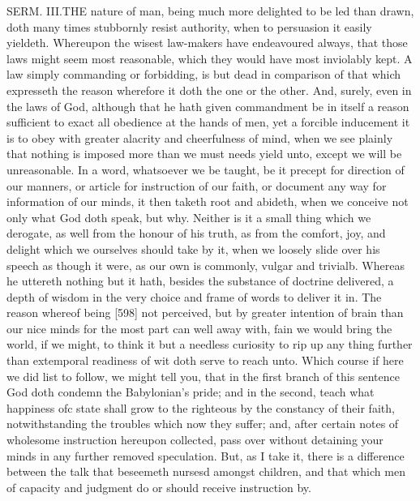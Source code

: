SERM. III.THE nature of man, being much more delighted to be led than drawn, doth many times stubbornly resist authority, when to persuasion it easily yieldeth. Whereupon the wisest law-makers have endeavoured always, that those laws might seem most reasonable, which they would have most inviolably kept. A law simply commanding or forbidding, is but dead in comparison of that which expresseth the reason wherefore it doth the one or the other. And, surely, even in the laws of God, although that he hath given commandment be in itself a reason sufficient to exact all obedience at the hands of men, yet a forcible inducement it is to obey with greater alacrity and cheerfulness of mind, when we see plainly that nothing is imposed more than we must needs yield unto, except we will be unreasonable. In a word, whatsoever we be taught, be it precept for direction of our manners, or article for instruction of our faith, or document any way for information of our minds, it then taketh root and abideth, when we conceive not only what God doth speak, but why. Neither is it a small thing which we derogate, as well from the honour of his truth, as from the comfort, joy, and delight which we ourselves should take by it, when we loosely slide over his speech as though it were, as our own is commonly, vulgar and trivialb. Whereas he uttereth nothing but it hath, besides the substance of doctrine delivered, a depth of wisdom in the very choice and frame of words to deliver it in. The reason whereof being [598] not perceived, but by greater intention of brain than our nice minds for the most part can well away with, fain we would bring the world, if we might, to think it but a needless curiosity to rip up any thing further than extemporal readiness of wit doth serve to reach unto. Which course if here we did list to follow, we might tell you, that in the first branch of this sentence God doth condemn the Babylonian’s pride; and in the second, teach what happiness ofc state shall grow to the righteous by the constancy of their faith, notwithstanding the troubles which now they suffer; and, after certain notes of wholesome instruction hereupon collected, pass over without detaining your minds in any further removed speculation. But, as I take it, there is a difference between the talk that beseemeth nursesd amongst children, and that which men of capacity and judgment do or should receive instruction by.

